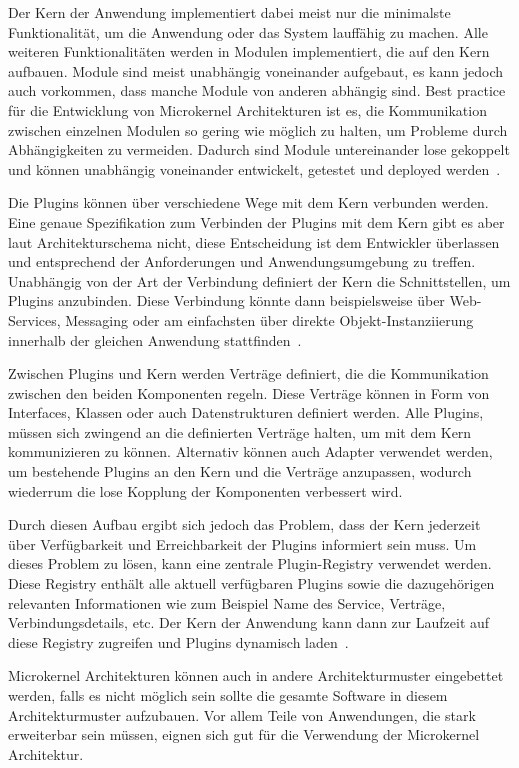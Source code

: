 \documentclass[acmtog]{acmart}
\begin{document}
Der Kern der Anwendung implementiert dabei meist nur die minimalste Funktionalität, um die Anwendung oder das System lauffähig zu machen.
Alle weiteren Funktionalitäten werden in Modulen implementiert, die auf den Kern aufbauen.
Module sind meist unabhängig voneinander aufgebaut, es kann jedoch auch vorkommen, dass manche Module von anderen abhängig sind.
Best practice für die Entwicklung von Microkernel Architekturen ist es, die Kommunikation zwischen einzelnen Modulen so gering wie möglich zu halten, um Probleme durch Abhängigkeiten zu vermeiden.
Dadurch sind Module untereinander lose gekoppelt und können unabhängig voneinander entwickelt, getestet und deployed werden~\cite[22]{architecturePatterns}.

Die Plugins können über verschiedene Wege mit dem Kern verbunden werden.
Eine genaue Spezifikation zum Verbinden der Plugins mit dem Kern gibt es aber laut Architekturschema nicht, diese Entscheidung ist dem Entwickler überlassen und entsprechend der Anforderungen und Anwendungsumgebung zu treffen.
Unabhängig von der Art der Verbindung definiert der Kern die Schnittstellen, um Plugins anzubinden.
Diese Verbindung könnte dann beispielsweise über Web-Services, Messaging oder am einfachsten über direkte Objekt-Instanziierung innerhalb der gleichen Anwendung stattfinden~\cite[22-23]{architecturePatterns}.

Zwischen Plugins und Kern werden Verträge definiert, die die Kommunikation zwischen den beiden Komponenten regeln.
Diese Verträge können in Form von Interfaces, Klassen oder auch Datenstrukturen definiert werden.
Alle Plugins, müssen sich zwingend an die definierten Verträge halten, um mit dem Kern kommunizieren zu können.
Alternativ können auch Adapter verwendet werden, um bestehende Plugins an den Kern und die Verträge anzupassen, wodurch wiederrum die lose Kopplung der Komponenten verbessert wird.

Durch diesen Aufbau ergibt sich jedoch das Problem, dass der Kern jederzeit über Verfügbarkeit und Erreichbarkeit der Plugins informiert sein muss.
Um dieses Problem zu lösen, kann eine zentrale Plugin-Registry verwendet werden.
Diese Registry enthält alle aktuell verfügbaren Plugins sowie die dazugehörigen relevanten Informationen wie zum Beispiel Name des Service, Verträge, Verbindungsdetails, etc.
Der Kern der Anwendung kann dann zur Laufzeit auf diese Registry zugreifen und Plugins dynamisch laden~\cite[22]{architecturePatterns}.

Microkernel Architekturen können auch in andere Architekturmuster eingebettet werden, falls es nicht möglich sein sollte die gesamte Software in diesem Architekturmuster aufzubauen.
Vor allem Teile von Anwendungen, die stark erweiterbar sein müssen, eignen sich gut für die Verwendung der Microkernel Architektur.
\end{document}
